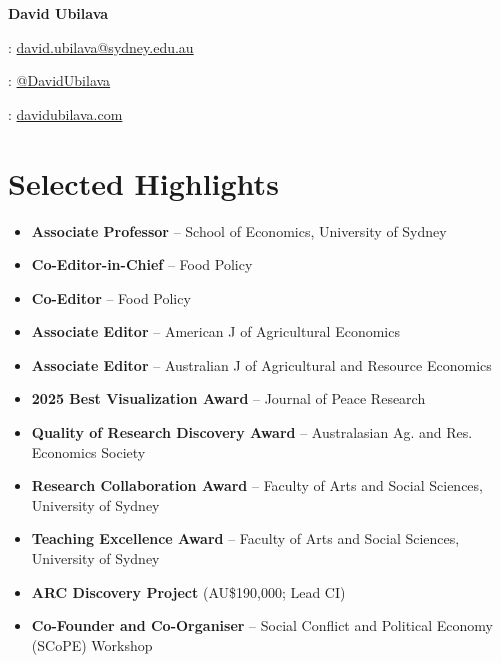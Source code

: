 \documentclass[10pt]{article}
\begin{document}
	
	
	
	\hspace{0.00in}\Large{\bfseries{David Ubilava \faGraduationCap}}
	\normalsize
	
	\medskip
	
	{\faEnvelope: \href{mailto:david.ubilava@sydney.edu.au}{david.ubilava@sydney.edu.au}}
	
	\smallskip
	
	{\faTwitter: \href{https://twitter.com/DavidUbilava}{@DavidUbilava}}
	
	\smallskip
	
	{\faGlobe: \href{https://davidubilava.com}{davidubilava.com}}
	
	\medskip
	
	
	\section*{Selected Highlights}
	\begin{itemize}
		\item {} \textbf{Associate Professor} -- School of Economics, University of Sydney
		\item {} \textbf{Co-Editor-in-Chief} -- Food Policy
		\item {} \textbf{Co-Editor} -- Food Policy
		\item {} \textbf{Associate Editor} -- American J of Agricultural Economics
		\item {} \textbf{Associate Editor} -- Australian J of Agricultural and Resource Economics
		\item {} \textbf{2025 Best Visualization Award} -- Journal of Peace Research
		\item {} \textbf{Quality of Research Discovery Award} -- Australasian Ag. and Res. Economics Society
		\item {} \textbf{Research Collaboration Award} -- Faculty of Arts and Social Sciences, University of Sydney
		\item {} \textbf{Teaching Excellence Award} -- Faculty of Arts and Social Sciences, University of Sydney
		\item {} \textbf{ARC Discovery Project} (AU\$190,000; Lead CI)
		\item {} \textbf{Co-Founder and Co-Organiser} -- Social Conflict and Political Economy (SCoPE) Workshop
	\end{itemize}
	
\end{document}
